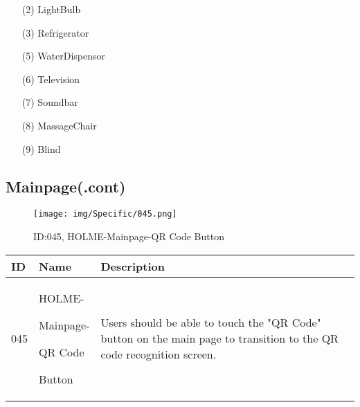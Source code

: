 \documentclass[conference]{IEEEtran}
\begin{document}
\begin{enumerate}
\begin{itemize}
\item [(2)] LightBulb\cite{LightBulb}\\
\item [(3)] Refrigerator\cite{Refrigerator}\\
\item [(5)] WaterDispensor\cite{WaterDispensor}\\
\item [(6)] Television\cite{Television}\\
\item [(7)] Soundbar\cite{Soundbar}\\
\item [(8)] MassageChair\cite{MassageChair}\\
\item [(9)] Blind\cite{Blind}\\
\end{itemize}

\clearpage

\subsection{Mainpage(.cont)}
\begin{figure}[h]
\centering
\texttt{[image: img/Specific/045.png]}
\caption{ID:045, HOLME-Mainpage-QR Code Button}
\end{figure}
\begin{table}[h]
\def\arraystretch{1.2} \small
    \begin{tabular}{|p{1cm}|p{1.8cm}|p{5.0cm}|}
        \hline
        ID & Name & Description\\ \hline
         045 \par  & HOLME-\par Mainpage-\par QR Code \par Button &Users should be able to touch the "QR Code" button on the main page to transition to the QR code recognition screen.\\ \hline
    \end{tabular}
\end{table}

\vspace{1cm}


\end{enumerate}
\end{document}
